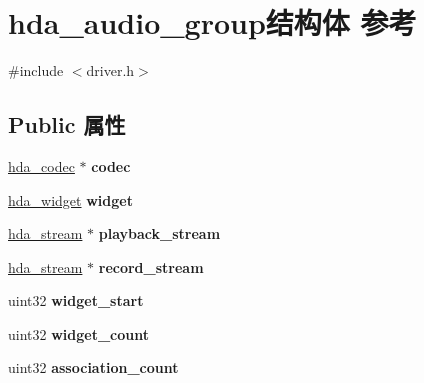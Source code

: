 \hypertarget{structhda__audio__group}{}\section{hda\+\_\+audio\+\_\+group结构体 参考}
\label{structhda__audio__group}


{\ttfamily \#include $<$driver.\+h$>$}

\subsection*{Public 属性}
\begin{DoxyCompactItemize}
\item 
\mbox{\label{structhda__audio__group_a29f89a36094b7cdbef90d3f24283d40d}} 
\hyperlink{structhda__codec}{hda\+\_\+codec} $\ast$ {\bfseries codec}
\item 
\mbox{\label{structhda__audio__group_a1073c7536025f64e515adebf71a1b173}} 
\hyperlink{structhda__widget}{hda\+\_\+widget} {\bfseries widget}
\item 
\mbox{\label{structhda__audio__group_ac975b1ffa8161c787a476cd63fcb21e2}} 
\hyperlink{structhda__stream}{hda\+\_\+stream} $\ast$ {\bfseries playback\+\_\+stream}
\item 
\mbox{\label{structhda__audio__group_a1ddfa73a6a3a13fe7293219ad8f18bf3}} 
\hyperlink{structhda__stream}{hda\+\_\+stream} $\ast$ {\bfseries record\+\_\+stream}
\item 
\mbox{\label{structhda__audio__group_a4349063b477751ef76c31ed8071052cf}} 
uint32 {\bfseries widget\+\_\+start}
\item 
\mbox{\label{structhda__audio__group_a1e71c77fe653bf7e634b450631db9514}} 
uint32 {\bfseries widget\+\_\+count}
\item 
\mbox{\label{structhda__audio__group_a2e203481f9bf2170a1a2da3e44d73b4c}} 
uint32 {\bfseries association\+\_\+count}
\item 
\mbox{\label{structhda__audio__group_acbfe2673901be8e58e9a3958c43ca108}} 

\end{DoxyCompactItemize}
